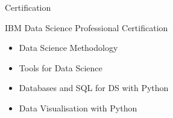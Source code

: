 \documentclass{article}
\newlength{\tabin}
\newlength{\secsep}
\newcommand{\lineunder}{\vspace*{-8pt} \\ \hspace*{-6pt} \hrulefill \\ \vspace*{-15pt}}
\newenvironment{tabbedsection}[1]{
  \begin{list}{}{
      \setlength{\itemsep}{0pt}
      \setlength{\labelsep}{0pt}
      \setlength{\labelwidth}{0pt}
      \setlength{\leftmargin}{\tabin}
      \setlength{\rightmargin}{\tabin}
      \setlength{\listparindent}{0pt}
      \setlength{\parsep}{0pt}
      \setlength{\parskip}{0pt}
      \setlength{\partopsep}{0pt}
      \setlength{\topsep}{#1}
    }
  \item[]
}{\end{list}}
\newenvironment{resume_section}[1]{
  \filbreak
  \vspace{2\secsep}
  \textsc{\large#1}
  \lineunder
  \begin{tabbedsection}{\secsep}
}{\end{tabbedsection}}
\newenvironment{resume_subsection}[2][]{
  \textbf{#2} \hfill {\footnotesize #1} \hspace{2em}
  \begin{tabbedsection}{0.5\secsep}
}{\end{tabbedsection}}
\newenvironment{subitems}{
  \renewcommand{\labelitemi}{-}
  \begin{itemize}
      \setlength{\labelsep}{1em}
}{\end{itemize}}
\begin{document}
\begin{resume_section}{Certification} \begin{resume_subsection}{IBM Data
Science Professional Certification} \begin{subitems}
\item Data Science Methodology
\item Tools for Data Science
\item Databases and SQL for DS with Python

\item Data Visualisation with Python \end{subitems}
\end{resume_subsection} \end{resume_section}
\end{document}
